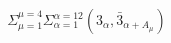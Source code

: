 \begin{equation}
\Sigma_{\mu=1}^{\mu=4} \Sigma_{\alpha=1}^{\alpha=12}
\left( 3_{\alpha}, \bar{3}_{\alpha + A_{\mu}} \right)
\label{modelfermions}
\end{equation}

